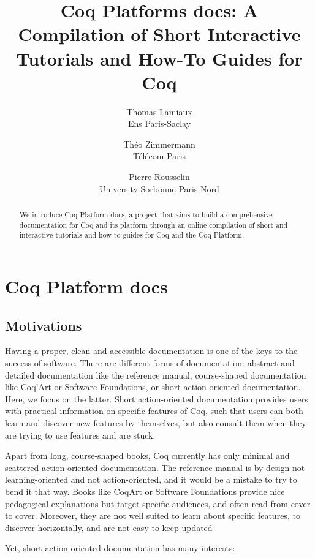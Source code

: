 \documentclass{article}[12pt]
\title{Coq Platforms docs: A Compilation of Short Interactive Tutorials and
How-To Guides for Coq}
\date{}
\author{
  Thomas Lamiaux \\
  Ens Paris-Saclay
  \and
  Théo Zimmermann \\
  Télécom Paris
  \and
  Pierre Rousselin \\
  University Sorbonne Paris Nord
}
\begin{document}
\maketitle

\begin{abstract}
  We introduce Coq Platform docs, a project that aims to build a comprehensive
  documentation for Coq and its platform through an online compilation of short
  and interactive tutorials and how-to guides for Coq and the Coq Platform.
\end{abstract}

\section{Coq Platform docs}

\subsection{Motivations}

Having a proper, clean and accessible documentation is one of the keys to the
success of software.
There are different forms of documentation: abstract and detailed documentation
like the reference manual, course-shaped documentation like Coq'Art or Software
Foundations, or short action-oriented documentation.
Here, we focus on the latter.
Short action-oriented documentation provides users with practical information on
specific features of Coq, such that users can both learn and discover new
features by themselves, but also consult them when they are trying to use
features and are stuck.

Apart from long, course-shaped books, Coq currently has only minimal and
scattered action-oriented documentation.
The reference manual is by design not learning-oriented and not action-oriented,
and it would be a mistake to try to bend it that way.
Books like CoqArt or Software Foundations provide nice pedagogical explanations
but target specific audiences, and often read from cover to cover.
Moreover, they are not well suited to learn about specific features, to discover
horizontally, and are not easy to keep updated

Yet, short action-oriented documentation has many interests:
\end{document}
